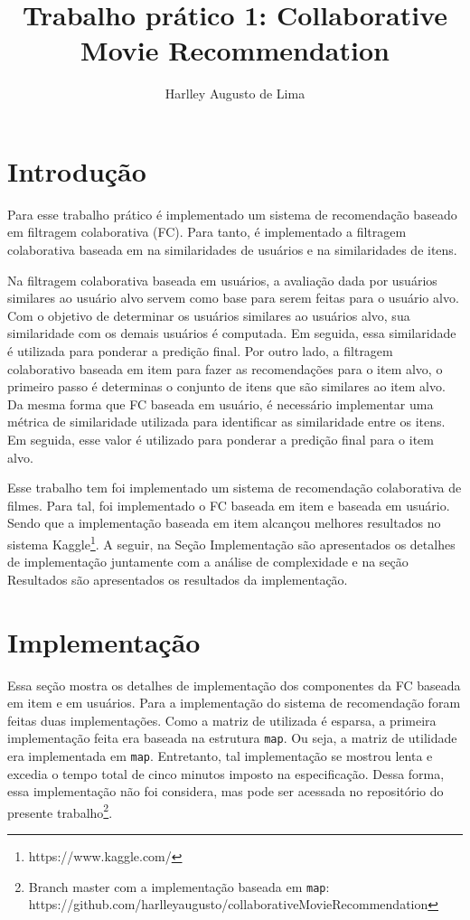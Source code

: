 \documentclass[brazil,a4paper,11pt]{article}
\title{Trabalho prático 1: Collaborative Movie Recommendation}
\author{Harlley Augusto de Lima}
\begin{document}
\maketitle

\section{Introdução}

Para esse trabalho prático é implementado um sistema de recomendação baseado em filtragem colaborativa (FC). Para tanto, é implementado a filtragem colaborativa baseada em na similaridades de usuários e na similaridades de itens. 

Na filtragem colaborativa baseada em usuários, a avaliação dada por usuários similares ao usuário alvo servem como base para serem feitas para o usuário alvo. Com o objetivo de determinar os usuários similares ao usuários alvo, sua similaridade com os demais usuários é computada. Em seguida, essa similaridade é utilizada para ponderar a predição final. Por outro lado, a filtragem colaborativo baseada em item para fazer as recomendações para o item alvo, o primeiro passo é determinas o conjunto de itens que são similares ao item alvo. Da mesma forma que FC baseada em usuário, é necessário implementar uma métrica de similaridade utilizada para identificar as similaridade entre os itens. Em seguida, esse valor é utilizado para ponderar a predição final para o item alvo.

Esse trabalho tem foi implementado um sistema de recomendação colaborativa de filmes. Para tal, foi implementado o FC baseada em item e baseada em usuário. Sendo que a implementação baseada em item alcançou melhores resultados no sistema Kaggle\footnote{https://www.kaggle.com/}. A seguir, na Seção Implementação são apresentados os detalhes de implementação juntamente com a análise de complexidade e na seção Resultados são apresentados os resultados da implementação.

\section{Implementação}

Essa seção mostra os detalhes de implementação dos componentes da FC baseada em item e em usuários. Para a implementação do sistema de recomendação foram feitas duas implementações. Como a matriz de utilizada é esparsa, a primeira implementação feita era baseada na estrutura \texttt{map}. Ou seja, a matriz de utilidade era implementada em \texttt{map}. Entretanto, tal implementação se mostrou lenta e excedia o tempo total de cinco minutos imposto na especificação. Dessa forma, essa implementação não foi considera, mas pode ser acessada no repositório do presente trabalho\footnote{Branch master com a implementação baseada em \texttt{map}:\\ https://github.com/harlleyaugusto/collaborativeMovieRecommendation}.
\end{document}

